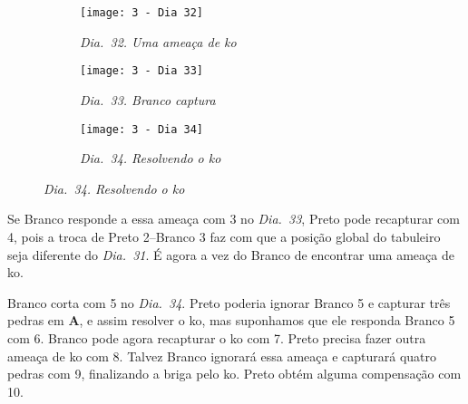 \begin{figure}[h]
  \centering
  \begin{subfigure}[t]{.3\textwidth}
      \centering
      \texttt{[image: 3 - Dia 32]}
      \caption*{\emph{Dia.\@~32. Uma ameaça de ko}}
  \end{subfigure}
  \hfill
  \begin{subfigure}[t]{.3\textwidth}
      \centering
      \texttt{[image: 3 - Dia 33]}
      \caption*{\emph{Dia.\@~33. Branco captura}}
  \end{subfigure}
  \hfill
  \begin{subfigure}[t]{.3\textwidth}
      \centering
      \texttt{[image: 3 - Dia 34]}
      \caption*{\emph{Dia.\@~34. Resolvendo o ko}}
  \end{subfigure}
\end{figure}

Se Branco responde a essa ameaça com 3 no \emph{Dia.\@~33}, Preto pode recapturar com 4, pois a troca de Preto 2--Branco 3 faz com que a posição global do tabuleiro seja diferente do \emph{Dia.\@~31}. É agora a vez do Branco de encontrar uma ameaça de ko.

Branco corta com 5 no \emph{Dia.\@~34}. Preto poderia ignorar Branco 5 e capturar três pedras em \textbf{A}, e assim  resolver o ko, mas suponhamos que ele responda Branco 5 com 6. Branco pode agora recapturar o ko com 7. Preto precisa fazer outra ameaça de ko com 8. Talvez Branco ignorará essa ameaça e capturará quatro pedras com 9, finalizando a briga pelo ko. Preto obtém alguma compensação com 10.